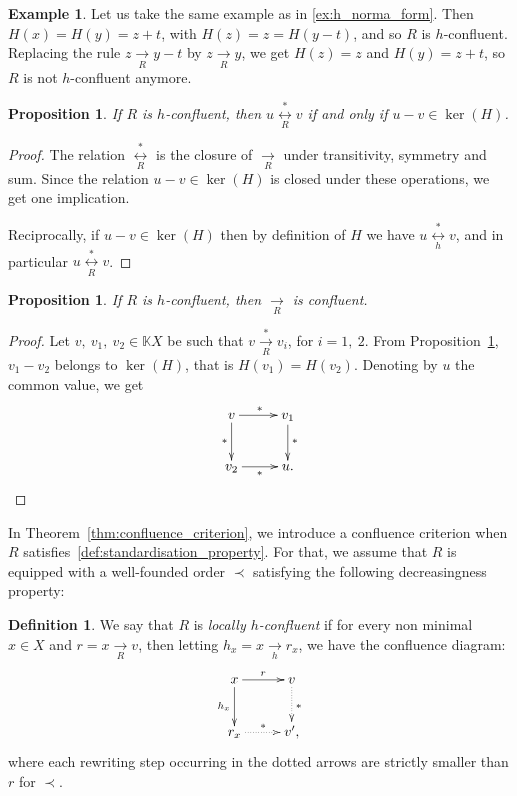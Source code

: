 \documentclass[10pt]{easychair}
\newtheorem{proposition}[theorem]{Proposition}
\theoremstyle{definition}
\newtheorem{definition}[theorem]{Definition}
\newtheorem{example}[theorem]{Example}
\newcommand\K{\mathbb{K}}
\newcommand\KX{\K X}
\newcommand\rewR{\underset{R}{\longrightarrow}}
\newcommand\rewh{\underset{h}{\longrightarrow}}
\newcommand\transR{\overset{*}{\rewR}}
\newcommand\equivR{\underset{R}{\overset{*}{\longleftrightarrow}}}
\newcommand\equivh{\underset{h}{\overset{*}{\longleftrightarrow}}}
\begin{document}
\begin{example}
Let us take the same example as in \ref{ex:h_norma_form}. Then $H(x) = H(y) = z + t$, with $H(z) = z = H(y - t)$, and so $R$ is $h$-confluent. Replacing the rule $z \rewR y - t$ by $z \rewR y$, we get $H(z) = z$ and $H(y) = z + t$, so $R$ is not $h$-confluent anymore. 
\end{example}

\begin{proposition}\label{prop:equationnal_theory}
  If $R$ is $h$-confluent, then
  $u \equivR v$ if and only if $u-v\in\ker(H)$.
\end{proposition}

\begin{proof}
The relation $\equivR$ is the closure of $\rewR$ under transitivity, symmetry and sum. Since the relation $u - v \in \ker(H)$ is closed under these operations, we get one implication.

Reciprocally, if $u - v \in \ker(H)$ then by definition of $H$ we have $u \equivh v$, and in particular $u \equivR v$.
\end{proof}

\begin{proposition}\label{prop:h-conf_implies_conf}
If $R$ is $h$-confluent, then $\rewR$ is confluent.
\end{proposition}
\begin{proof}
  Let $v,\ v_1,\ v_2\in\KX$ be such that $v\transR v_i$, for $i=1,\ 2$.
  From Proposition~\ref{prop:equationnal_theory}, $v_1-v_2$ belongs to
  $\ker(H)$, that is $H(v_1)=H(v_2)$. Denoting by $u$ the common value, we get
  \[
    \xymatrix @C = 2.5em @R = 2.5em{
    v 
    \ar [r] ^{*}
    \ar[d] _{*}
     &
      v_1
      \ar@{>} [d] ^{*}
      \\
      v_2
      \ar@{>} [r] _{*}
      & 
      u.
    }
  \]
\end{proof}

In Theorem~\ref{thm:confluence_criterion}, we introduce a confluence
criterion when $R$ satisfies~\ref{def:standardisation_property}. For
that, we assume that $R$ is equipped with a well-founded order $\prec$
satisfying the following decreasingness property:

\begin{definition}\label{proper:decreasingness_property}
  We say that $R$ is \emph{locally $h$-confluent} if for every non
  minimal $x\in X$ and $r=x\rewR v$, then letting $h_x=x\rewh r_x$, we
  have the confluence diagram:
  \[
    \xymatrix @C = 2.5em @R = 2.5em{
    x 
    \ar [r] ^{r}
    \ar[d] _{h_x}
     &
      v
      \ar@{.>} [d] ^{*}
      \\
      r_x
      \ar@{.>} [r] ^{*}
      & 
      v',
    }
  \]
  where each rewriting step occurring in the dotted arrows are strictly
  smaller than $r$ for $\prec$.
\end{definition}
\end{document}
